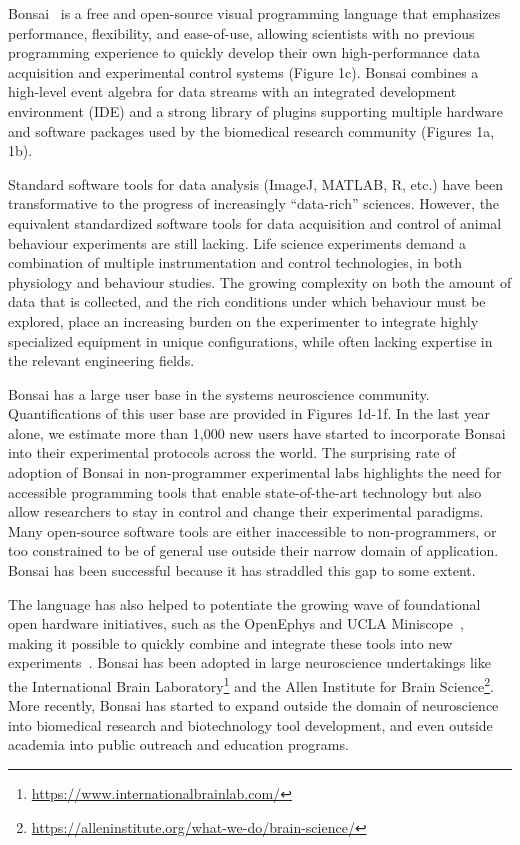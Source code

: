 
Bonsai~\citep{lopesEtAl15,lopesAndMonteiro21} is a free and open-source visual
programming language that emphasizes performance, flexibility, and ease-of-use,
allowing scientists with no previous programming experience to quickly develop
their own high-performance data acquisition and experimental control systems
(Figure 1c). Bonsai combines a high-level event algebra for data streams with
an integrated development environment (IDE) and a strong library of plugins
supporting multiple hardware and software packages used by the biomedical
research community (Figures 1a, 1b).

Standard software tools for data analysis (ImageJ, MATLAB, R, etc.) have been
transformative to the progress of increasingly “data-rich” sciences. However,
the equivalent standardized software tools for data acquisition and control of
animal behaviour experiments are still lacking. Life science experiments demand
a combination of multiple instrumentation and control technologies, in both
physiology and behaviour studies. The growing complexity on both the amount of
data that is collected, and the rich conditions under which behaviour must be
explored, place an increasing burden on the experimenter to integrate highly
specialized equipment in unique configurations, while often lacking expertise
in the relevant engineering fields.

Bonsai has a large user base in the systems neuroscience community.
Quantifications of this user base are provided in Figures 1d-1f.  In the last
year alone, we estimate more than 1,000 new users have started to incorporate
Bonsai into their experimental protocols across the world. The surprising rate
of adoption of Bonsai in non-programmer experimental labs highlights the need
for accessible programming tools that enable state-of-the-art technology but
also allow researchers to stay in control and change their experimental
paradigms.  Many open-source software tools are either inaccessible to
non-programmers, or too constrained to be of general use outside their narrow
domain of application. Bonsai has been successful because it has straddled this
gap to some extent.

The language has also helped to potentiate the growing wave of foundational
open hardware initiatives, such as the OpenEphys \citep{siegleEtAl17} and UCLA
Miniscope~\citep{caiEtAl16}, making it possible to quickly combine and
integrate these tools into new experiments~\citep{buccinoEtAl18}.
%
Bonsai has been adopted in large neuroscience undertakings like the
International Brain
Laboratory\footnote{\href{https://www.internationalbrainlab.com/}{https://www.internationalbrainlab.com/}}
and the Allen Institute for Brain
Science\footnote{\href{https://alleninstitute.org/what-we-do/brain-science/}{https://alleninstitute.org/what-we-do/brain-science/}}.
%
More recently, Bonsai has started to expand outside the domain of neuroscience
into biomedical research and biotechnology tool development, and even outside
academia into public outreach and education programs.

